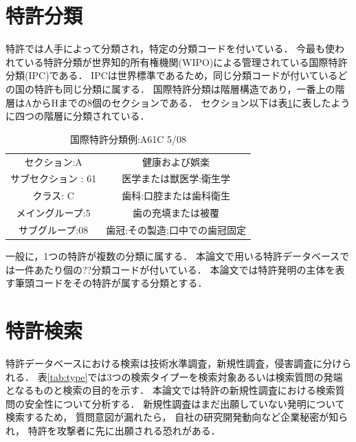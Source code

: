 \documentclass[master]{suribt}
\theoremstyle{definition}
\begin{document}
 \section{特許分類}
 特許では人手によって分類され，特定の分類コードを付いている．
 今最も使われている特許分類が世界知的所有権機関(WIPO)による管理されている国際特許分類(IPC)である．
 IPCは世界標準であるため，同じ分類コードが付いているどの国の特許も同じ分類に属する．
 国際特許分類は階層構造であり，一番上の階層はAからHまでの8個のセクションである．
 セクション以下は表\ref{tab:IPC}に表したように四つの階層に分類されている．
 
 \begin{table}[!hbp]
 \center
 \begin{tabular}{cc}
    セクション:A & 健康および娯楽 \\
    サブセクション : 61 & 医学または獣医学:衛生学 \\
    クラス: C & 歯科:口腔または歯科衛生 \\
    メイングループ:5 & 歯の充填または被覆 \\
    サブグループ:08 & 歯冠:その製造;口中での歯冠固定 \\
 \end{tabular}
 \caption{国際特許分類例:A61C 5/08}
 \label{tab:IPC}
 \end{table}
 
 一般に，1つの特許が複数の分類に属する．
 本論文で用いる特許データベースでは一件あたり個の??分類コードが付いている．
 本論文では特許発明の主体を表す筆頭コードをその特許が属する分類とする．
 
 \section{特許検索}
 特許データベースにおける検索は技術水準調査，新規性調査，侵害調査に分けられる．
 表\ref{tab:type}では3つの検索タイプーを検索対象あるいは検索質問の発端となるものと検索の目的を示す．
 本論文では特許の新規性調査における検索質問の安全性について分析する．
 新規性調査はまだ出願していない発明について検索するため，
 質問意図が漏れたら，
 自社の研究開発動向など企業秘密が知られ，
 特許を攻撃者に先に出願される恐れがある．
 
\end{document}
